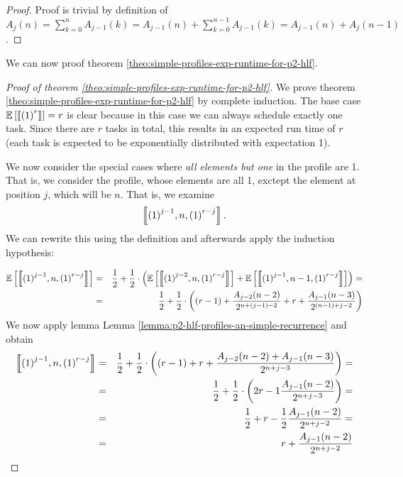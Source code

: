 \begin{proof}
  Proof is trivial by definition of $A_{j}(n) = \sum_{k=0}^{n} A_{j-1}(k) = A_{j-1}(n) + \sum_{k=0}^{n-1} A_{j-1}(k) = A_{j-1}(n) + A_{j}(n-1)$.
\end{proof}

We can now proof theorem \ref{theo:simple-profiles-exp-runtime-for-p2-hlf}.

\begin{proof}[Proof of theorem \ref{theo:simple-profiles-exp-runtime-for-p2-hlf}]
  We prove theorem \ref{theo:simple-profiles-exp-runtime-for-p2-hlf} by complete induction. The base case $\mathbb{E}\left[ \left\llbracket {(1)}^{r} \right\rrbracket \right] = r$ is clear because in this case we can always schedule exactly one task. Since there are $r$ tasks in total, this results in an expected run time of $r$ (each task is expected to be exponentially distributed with expectation 1).

  We now consider the special cases where \emph{all elements but one} in the profile are 1. That is, we consider the profile, whose elements are all 1, exctept the element at position $j$, which will be $n$. That is, we examine
  \begin{equation*}
    \left\llbracket {(1)}^{j-1},n,{(1)}^{r-j} \right\rrbracket.
  \end{equation*}
  We can rewrite this using the definition and afterwards apply the induction hypothesis:

  \begin{eqnarray*}
    \mathbb{E}\left[ \left\llbracket {(1)}^{j-1},n,{(1)}^{r-j} \right\rrbracket \right]
    & = & 
    \frac{1}{2} + \frac{1}{2} \cdot 
    \left( 
      \mathbb{E}\left[ \left\llbracket {(1)}^{j-2},n,{(1)}^{r-j} \right\rrbracket \right] + 
      \mathbb{E}\left[ \left\llbracket {(1)}^{j-1},n-1,{(1)}^{r-j} \right\rrbracket \right]
    \right) = \\
    & = & 
    \frac{1}{2} + \frac{1}{2} \cdot 
    \left( 
      (r-1) + \frac{A_{j-2}(n-2)}{2^{n+(j-1)-2}} +
      r + \frac{A_{j-1}(n-3)}{2^{(n-1)+j-2}}
    \right)
  \end{eqnarray*}
  We now apply lemma Lemma \ref{lemma:p2-hlf-profiles-an-simple-recurrence} and obtain
  \begin{eqnarray*}
    \left\llbracket {(1)}^{j-1},n,{(1)}^{r-j} \right\rrbracket
    & = & 
    \frac{1}{2} + \frac{1}{2} \cdot 
    \left( 
      (r-1)+r + 
      \frac{A_{j-2}(n-2) + A_{j-1}(n-3)}{2^{n+j-3}}
    \right) = \\
    & = &
    \frac{1}{2} + \frac{1}{2} \cdot 
    \left( 
      2r - 1
      \frac{A_{j-1}(n-2)}{2^{n+j-3}}
    \right) = \\
    & = &
    \frac{1}{2} + 
    r - \frac{1}{2}
    \frac{A_{j-1}(n-2)}{2^{n+j-2}} = \\
    & = &
    r + \frac{A_{j-1}(n-2)}{2^{n+j-2}}
  \end{eqnarray*}


\end{proof}

